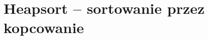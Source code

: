 \chapter{Heapsort -- sortowanie przez kopcowanie}

\makeatletter
{}
\makeatother







\problems




